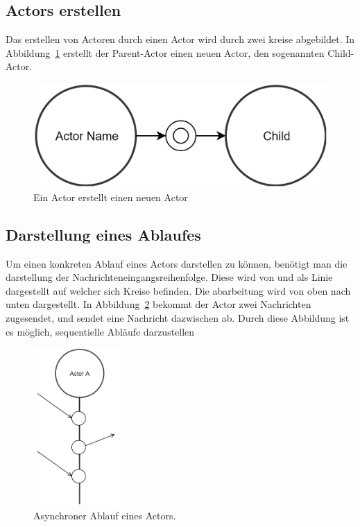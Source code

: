 \subsection{Actors erstellen}
Das erstellen von Actoren durch einen Actor wird durch zwei kreise abgebildet. In Abbildung~\ref{fig:actor:diagram:childActorCreation} erstellt der {Parent}-Actor einen neuen Actor, den sogenannten {Child}-Actor.
\begin{figure}
    \centering
    \includegraphics[width=\linewidth]{gfx/actor/childActorCreation}
    \caption{Ein Actor erstellt einen neuen Actor}
    \label{fig:actor:diagram:childActorCreation}
\end{figure}

\subsection{Darstellung eines Ablaufes}
Um einen konkreten Ablauf eines Actors darstellen zu können, benötigt man die darstellung der Nachrichteneingangsreihenfolge. Diese wird von \cite{kuhn2017reactive} und \cite{Vernon2015ReactiveAkka} als Linie dargestellt auf welcher sich Kreise befinden. Die abarbeitung wird von oben nach unten dargestellt. In Abbildung~\ref{fig:actor:diagram:asynchronMessageReceivment} bekommt der Actor zwei Nachrichten zugesendet, und sendet eine Nachricht dazwischen ab. Durch diese Abbildung ist es möglich, sequentielle Abläufe darzustellen
\begin{figure}
    \centering
    \includegraphics[height=6cm]{gfx/actor/actorAsynchMessgeFlow}
    \caption{Asynchroner Ablauf eines Actors.}
    \label{fig:actor:diagram:asynchronMessageReceivment}
\end{figure}